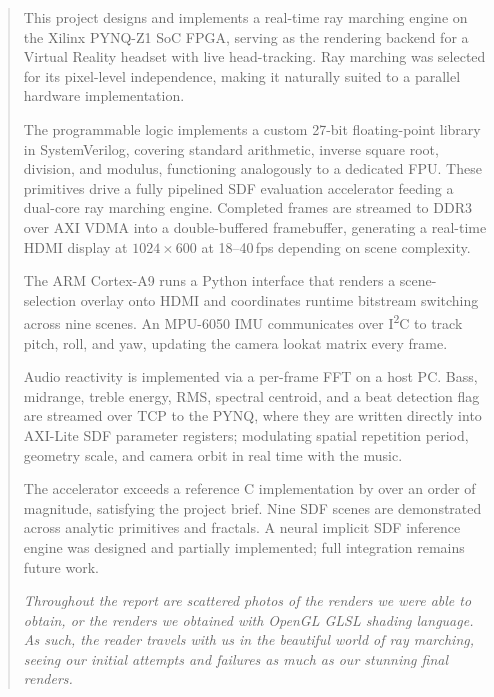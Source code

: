 \begin{abstract}
This project designs and implements a real-time ray marching engine on the
Xilinx PYNQ-Z1 SoC FPGA, serving as the rendering backend for a Virtual
Reality headset with live head-tracking. Ray marching was selected for its
pixel-level independence, making it naturally suited to a parallel hardware
implementation.

The programmable logic implements a custom 27-bit floating-point library in
SystemVerilog, covering standard arithmetic, inverse square root, division,
and modulus, functioning analogously to a dedicated FPU. These primitives
drive a fully pipelined SDF evaluation accelerator feeding a dual-core ray
marching engine. Completed frames are streamed to DDR3 over AXI VDMA into a
double-buffered framebuffer, generating a real-time HDMI display at
$1024\times600$ at 18--40\,fps depending on scene complexity.

The ARM Cortex-A9 runs a Python interface that renders a scene-selection
overlay onto HDMI and coordinates runtime bitstream switching across nine
scenes. An MPU-6050 IMU communicates over I\textsuperscript{2}C to track
pitch, roll, and yaw, updating the camera lookat matrix every frame.

Audio reactivity is implemented via a per-frame FFT on a host PC. Bass,
midrange, treble energy, RMS, spectral centroid, and a beat detection flag
are streamed over TCP to the PYNQ, where they are written directly into
AXI-Lite SDF parameter registers; modulating spatial repetition period,
geometry scale, and camera orbit in real time with the music.

The accelerator exceeds a reference C implementation by over an order of
magnitude, satisfying the project brief. Nine SDF scenes are demonstrated
across analytic primitives and fractals. A neural implicit SDF inference
engine was designed and partially implemented; full integration remains
future work.

\bigskip
\vspace{2cm}
\textit{Throughout the report are scattered photos of the renders we were
able to obtain, or the renders we obtained with OpenGL GLSL shading language. As such, the reader travels with us in the beautiful world
of ray marching, seeing our initial attempts and failures as much as our
stunning final renders.}
\end{abstract}
